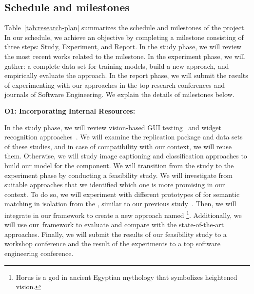 \subsection{Schedule and milestones}



Table~\ref{tab:research-plan} summarizes the schedule and milestones of the \project project.
In our schedule, we achieve an objective by completing a milestone  consisting of three steps: Study, Experiment, and Report. 
 In the study phase, we will review the most recent works related to the milestone.
In the experiment phase, we will gather: a complete data set for training models, build a new \testreuse approach, and empirically evaluate the approach. 
In the report phase, we will submit the results of experimenting with our approaches in  the top research conferences and journals of Software Engineering.
We explain the details of milestones below.

\smallskip
\noindent
\textbf{O1: Incorporating Internal Resources:}  

\noindent
In the study phase, we will review vision-based GUI testing~\cite{Hu:appflow:FSE:2018,zhao:Avgust:FSE:2022,YazdaniBanafsheDaragh:DEEPGUI:ASE:2021}  and widget recognition approaches~\cite{white:WidgetDetection:ISSTA:2019,zhu2021widgetrecog}. 
We will examine the replication package and data sets of these studies, and in case of compatibility with our context, we will reuse them. 
Otherwise, we will study image captioning and classification approaches to build our model for the \imagelabeler component.
%
We will transition from the study to the experiment phase by conducting a feasibility study. 
We will investigate from suitable approaches that we identified which one is more promising in our context.
To do so, we will experiment with different prototypes of \imagelabeler for semantic matching in isolation from the \testreuse,  similar to our previous study~\cite{mariani:SemFinder:ISSTA:2021}. 
Then, we will integrate \imagelabeler in our \tme framework to create a new \testreuse approach named \visiontool\footnote{Horus is a god in ancient Egyptian mythology that symbolizes heightened vision.}.
Additionally, we will use our~\tme framework to evaluate \visiontool and compare with the state-of-the-art \testreuse approaches.
Finally, we will submit the results of our  feasibility study to a workshop conference and the result of the \testreuse experiments to a top software engineering conference. 

